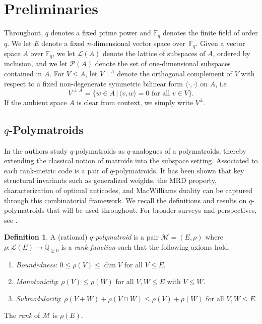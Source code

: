 \documentclass[onecolumn,draftclsnofoot,12pt]{IEEEtran}
\renewcommand{\P}{\mathcal{P}}
\newcommand{\M}{\mathcal{M}}
\theoremstyle{plain} %
\theoremstyle{definition}
\newtheorem{definition}[theorem]{Definition}
\begin{document}
\section{Preliminaries} \label{sec:prelim}

Throughout, $q$ denotes a fixed prime power and $\mathbb{F}_q$ denotes the finite field of order $q$. We let $E$ denote a fixed $n$-dimensional vector space over~$\mathbb{F}_q$. Given a vector space $A$ over $\mathbb{F}_q$, we let $\mathcal{L}(A)$ denote the lattice of subspaces of $A$, ordered by inclusion, and we let $\P(A)$ denote the set of one-dimensional subspaces contained in $A$. 
%
For $V \leq A$, let $V^{\perp A}$ denote the orthogonal complement of $V$ with respect to a fixed non-degenerate symmetric bilinear form $\langle \cdot , \cdot \rangle$ on $A$, i.e
\[
    V^{\perp A} = \{ w\in A \,|\, \langle v,w\rangle = 0 \text{ for all } v \in V\}.
\]
If the ambient space $A$ is clear from context, we simply write $V^\perp$.

\subsection{\texorpdfstring{$q$}{q}-Polymatroids}
In \cite{Gorla_2019,Shiromoto} the authors study $q$-polymatroids as $q$-analogues of a polymatroids, thereby extending the classical notion of matroids into the subspace setting. Associated to each rank-metric code is a pair of $q$-polymatroids. It has been shown that key structural invariants such as generalized weights, the MRD property, characterization of optimal anticodes, and MacWilliams duality can be captured through this combinatorial framework. We recall the definitions and results on $q$-polymatroids that will be used throughout. For broader surveys and perspectives, see \cite{DBLP:journals/corr/abs-2104-06570, BYRNE2024105799, vertigan}.


\begin{definition} A (rational) \textit{$q$-polymatroid} is a pair $\mathcal{M} = (E,\rho)$ where $\rho\colon \mathcal{L} (E) \rightarrow \mathbb{Q}_{\geq 0}$ is a \textit{rank function} such that the following axioms hold.
\begin{enumerate}
    \item[(R1)] \textit{Boundedness}: $0\leq \rho(V) \leq \dim V$ for all $V\leq E$.
    \item[(R2)] \textit{Monotonicity}: $\rho(V)\leq \rho(W)$ for all $V,W\leq E$ with $V\leq W$.
    \item[(R3)] \textit{Submodularity}: $\rho(V + W) + \rho(V\cap W ) \leq \rho(V) + \rho(W)$ for all $V,W\leq E$.
\end{enumerate}
The \emph{rank} of $\M$ is $\rho(E)$. \label{def:qpolymatroid}
\end{definition}
\end{document}
